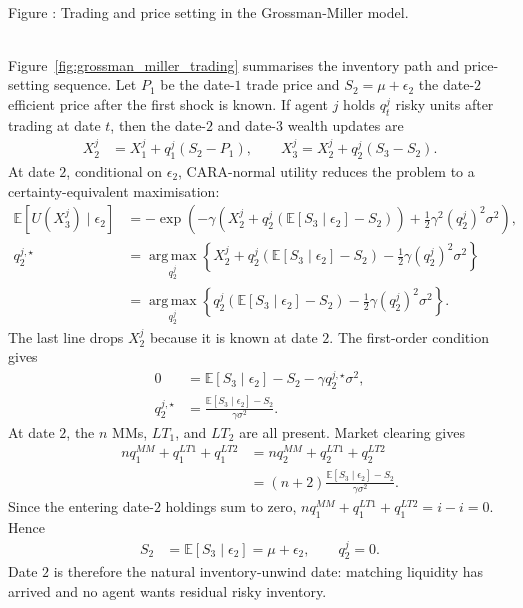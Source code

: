 \documentclass[a4paper,oneside,openany]{book}
\newcommand{\figdir}{../../../compendium/execution-market-making/figures}
\begin{document}
\begin{model}
\begin{center}
\label{fig:grossman_miller_trading}
\scalebox{0.82}{}\\
{\small Figure \thefigure: Trading and price setting in the Grossman-Miller model.}
\end{center}

\par\smallskip\noindent{}\\
Figure~\ref{fig:grossman_miller_trading} summarises the inventory path and price-setting sequence. Let $P_1$ be the date-$1$ trade price and $S_2=\mu+\epsilon_2$ the date-$2$ efficient price after the first shock is known. If agent $j$ holds $q_t^j$ risky units after trading at date $t$, then the date-$2$ and date-$3$ wealth updates are
\begin{align*}
X_2^j&=X_1^j+q_1^j(S_2-P_1), \qquad X_3^j=X_2^j+q_2^j(S_3-S_2).
\end{align*}
At date $2$, conditional on $\epsilon_2$, CARA-normal utility reduces the problem to a certainty-equivalent maximisation:
\begin{align*}
\mathbb{E}\left[U(X_3^j)\mid\epsilon_2\right]
&=-\exp\left(-\gamma\left(X_2^j+q_2^j(\mathbb{E}[S_3\mid\epsilon_2]-S_2)\right)+\frac{1}{2}\gamma^2(q_2^j)^2\sigma^2\right),\\
q_2^{j,\star}
&=\operatorname*{arg\,max}_{q_2^j}\left\{X_2^j+q_2^j(\mathbb{E}[S_3\mid\epsilon_2]-S_2)-\frac{1}{2}\gamma(q_2^j)^2\sigma^2\right\}\\
&=\operatorname*{arg\,max}_{q_2^j}\left\{q_2^j(\mathbb{E}[S_3\mid\epsilon_2]-S_2)-\frac{1}{2}\gamma(q_2^j)^2\sigma^2\right\}.
\end{align*}
The last line drops $X_2^j$ because it is known at date $2$. The first-order condition gives
\begin{align*}
0&=\mathbb{E}[S_3\mid\epsilon_2]-S_2-\gamma q_2^{j,\star}\sigma^2,\\
q_2^{j,\star}&=\frac{\mathbb{E}[S_3\mid\epsilon_2]-S_2}{\gamma\sigma^2}.
\end{align*}
At date $2$, the $n$ MMs, $LT_1$, and $LT_2$ are all present. Market clearing gives
\begin{align*}
nq_1^{MM}+q_1^{LT1}+q_1^{LT2}
&=nq_2^{MM}+q_2^{LT1}+q_2^{LT2}\\
&=(n+2)\frac{\mathbb{E}[S_3\mid\epsilon_2]-S_2}{\gamma\sigma^2}.
\end{align*}
Since the entering date-$2$ holdings sum to zero, $nq_1^{MM}+q_1^{LT1}+q_1^{LT2}=i-i=0$. Hence
\begin{align*}
S_2&=\mathbb{E}[S_3\mid\epsilon_2]=\mu+\epsilon_2, \qquad q_2^j=0.
\end{align*}
Date $2$ is therefore the natural inventory-unwind date: matching liquidity has arrived and no agent wants residual risky inventory.


\end{model}
\end{document}
